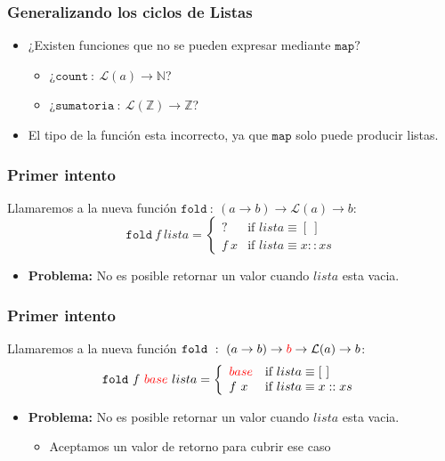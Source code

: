\documentclass{beamer}
\begin{document}
\begin{frame}
    \frametitle{Generalizando los ciclos de Listas}
    \begin{itemize}
        \item{¿Existen funciones que no se pueden expresar mediante $\mathtt{map}?$
        \begin{itemize}
            \item{¿$\mathtt{count}\ :\ \mathcal{L}(a)\rightarrow \mathbb{N}$?}
            \item{¿$\mathtt{sumatoria}\ :\ \mathcal{L}(\mathbb{Z})\rightarrow \mathbb{Z}$?}
        \end{itemize}
        }
        \item{El tipo de la funci\'on esta incorrecto, ya que $\mathtt{map}$ solo
        puede producir listas.}
    \end{itemize}
\end{frame}

\begin{frame}
    \frametitle{Primer intento}
    Llamaremos a la nueva funci\'on $\mathtt{fold}\ :\ (a\rightarrow b)\rightarrow
        \mathcal{L}(a)\rightarrow b$:
    $$
    \mathtt{fold}\ f\ lista = \left\{
        \begin{array}{ll}
            ? & \mbox{if }lista\equiv [\ ] \\
            f\ x & \mbox{if }lista\equiv x::xs
        \end{array}
    \right.
    $$
    \begin{itemize}
        \item{{\bf Problema: }No es posible retornar un valor cuando $lista$ esta vacia.}
    \end{itemize}
\end{frame}

\begin{frame}
    \frametitle{Primer intento}
    Llamaremos a la nueva funci\'on $\mathtt{fold}\ :\ (a\rightarrow b)\rightarrow
        {\color{red} b} \rightarrow \mathcal{L}(a)\rightarrow b$:
    $$
    \mathtt{fold}\ f\ {\color{red} base}\ lista=\left\{
        \begin{array}{ll}
            {\color{red} base} & \mbox{if }lista\equiv [\ ] \\
            f\ x & \mbox{if }lista\equiv x::xs
        \end{array}
    \right.
    $$
    \begin{itemize}
        \item{{\bf Problema: }No es posible retornar un valor cuando $lista$ esta vacia.
        \begin{itemize}
            \item{Aceptamos un valor de retorno para cubrir ese caso}
        \end{itemize}
        }
    \end{itemize}
\end{frame}
\end{document}
